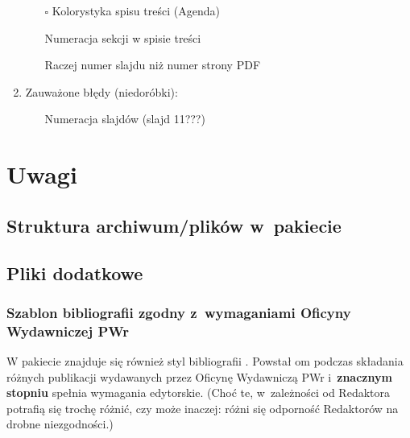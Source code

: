 \documentclass[12pt,aspectratio=169,ignorenonframetext]{beamer}
\newcommand{\cmark}{\ding{51}}%
\newcommand{\done}{\rlap{$\square$}{\raisebox{2pt}{\large\hspace{1pt}\cmark}}%
 \hspace{-2.5pt}}
\newcommand{\emptybox}{$\square$}
\begin{document}
\begin{frame}
\begin{enumerate}
        \begin{itemize}
         \item[\emptybox] Kolorystyka spisu treści (Agenda)
         \item[\done] Numeracja sekcji w spisie treści
          \item[\done] Raczej numer slajdu niż numer strony PDF
        \end{itemize}
  \item Zauważone błędy (niedoróbki):
        \begin{itemize}
         \item[\done]
               Numeracja slajdów (slajd 11???)
        \end{itemize}
 \end{enumerate}
\end{frame}

%

\section{Uwagi}

\subsection{Struktura archiwum/plików w~pakiecie}

{
 \footnotesize
 
}

\subsection{Pliki dodatkowe}

\subsubsection{Szablon bibliografii zgodny z~wymaganiami Oficyny Wydawniczej PWr}

W pakiecie znajduje się również styl bibliografii . Powstał om podczas składania różnych publikacji wydawanych przez Oficynę Wydawniczą PWr i~\textbf{znacznym stopniu} spełnia wymagania edytorskie. (Choć te, w~zależności od Redaktora potrafią się trochę różnić, czy może inaczej: różni się odporność Redaktorów na drobne niezgodności.)
\end{document}
